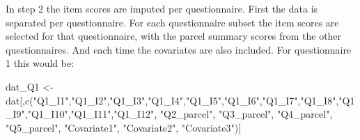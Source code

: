\documentclass[
]{book}
\newenvironment{Shaded}{\begin{snugshade}}{\end{snugshade}}
\newcommand{\FunctionTok}[1]{\textcolor[rgb]{0.00,0.00,0.00}{#1}}
\newcommand{\NormalTok}[1]{#1}
\newcommand{\OtherTok}[1]{\textcolor[rgb]{0.56,0.35,0.01}{#1}}
\newcommand{\StringTok}[1]{\textcolor[rgb]{0.31,0.60,0.02}{#1}}
\begin{document}
In step 2 the item scores are imputed per questionnaire. First the data is separated per questionnaire. For each questionnaire subset the item scores are selected for that questionnaire, with the parcel summary scores from the other questionnaires. And each time the covariates are also included. For questionnaire 1 this would be:

\begin{Shaded}
\begin{Highlighting}[]
\NormalTok{dat\_Q1 }\OtherTok{\textless{}{-}}\NormalTok{ dat[,}\FunctionTok{c}\NormalTok{(}\StringTok{"Q1\_I1"}\NormalTok{,}\StringTok{"Q1\_I2"}\NormalTok{,}\StringTok{"Q1\_I3"}\NormalTok{,}\StringTok{"Q1\_I4"}\NormalTok{,}\StringTok{"Q1\_I5"}\NormalTok{,}\StringTok{"Q1\_I6"}\NormalTok{,}\StringTok{"Q1\_I7"}\NormalTok{,}\StringTok{"Q1\_I8"}\NormalTok{,}\StringTok{"Q1\_I9"}\NormalTok{,}\StringTok{"Q1\_I10"}\NormalTok{,}\StringTok{"Q1\_I11"}\NormalTok{,}\StringTok{"Q1\_I12"}\NormalTok{, }
                    \StringTok{"Q2\_parcel"}\NormalTok{, }\StringTok{"Q3\_parcel"}\NormalTok{, }\StringTok{"Q4\_parcel"}\NormalTok{, }\StringTok{"Q5\_parcel"}\NormalTok{,}
                    \StringTok{"Covariate1"}\NormalTok{, }\StringTok{"Covariate2"}\NormalTok{, }\StringTok{"Covariate3"}\NormalTok{)]}
\end{Highlighting}
\end{Shaded}
\end{document}
